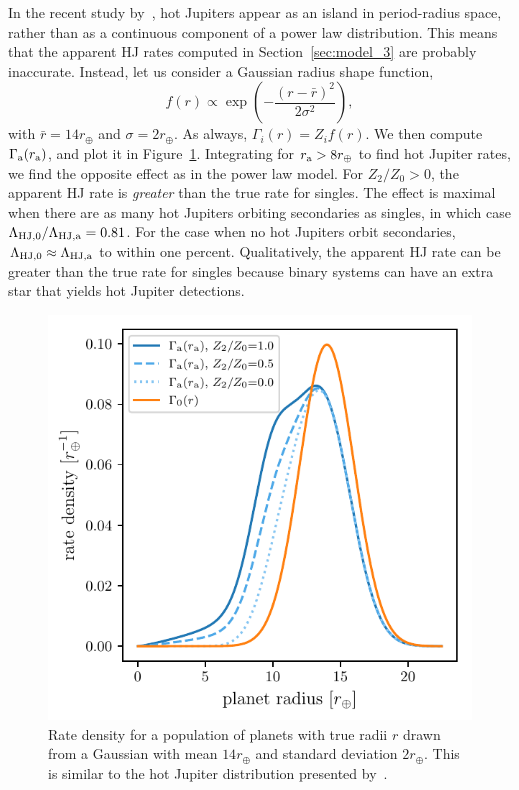 \documentclass[12pt,modern]{aastex61}
\renewcommand{\a}{_{\rm a}}
\begin{document}
In the recent study by~\citet{petigura_CKS_2017}, hot Jupiters appear as an 
island in period-radius space, rather than as a continuous component of a 
power law distribution.
This means that the apparent HJ rates computed in 
Section~\ref{sec:model_3} are probably inaccurate.
Instead, let us consider a Gaussian radius shape function,
\begin{equation}
f(r) \propto \exp \left( -\frac{(r-\bar{r})^2}{2\sigma^2} \right),
\end{equation}
with $\bar{r} = 14r_\oplus$ and $\sigma = 2r_\oplus$.
As always, $\Gamma_i(r) = Z_i f(r)$.
We then compute $\Gamma\a(r\a)$, and plot it in Figure~\ref{fig:gaussian_HJ}.
Integrating for $r\a > 8r_\oplus$ to find hot Jupiter rates,
we find the opposite effect as in the power law model.
For $Z_2/Z_0>0$, 
the apparent HJ rate is {\it greater} than the true rate for singles.
The effect is maximal when there are as many hot Jupiters orbiting secondaries 
as singles, in which case
$\Lambda_{{\rm HJ},0}/\Lambda_{\rm HJ,a} = 0.81$.
For the case when no hot Jupiters orbit secondaries, $\Lambda_{{\rm HJ},0} 
\approx \Lambda_{\rm HJ,a}$ to within one percent.
Qualitatively, the apparent HJ rate can be greater than the true rate for 
singles because binary systems can have an extra star that yields 
hot Jupiter detections.


\begin{figure}[!tb]
    \centering
    \includegraphics[width=.6\textwidth]{figures/int_rate_density_vs_radius_model_7_rpu_22.5_manyZs.pdf}
    \caption{
        Rate density for a population of planets with true radii $r$ drawn from
        a Gaussian with mean $14r_\oplus$ and standard deviation $2r_\oplus$.
        This is similar to the hot Jupiter distribution presented 
        by~\citet{petigura_CKS_2017}.
    }
    \label{fig:gaussian_HJ}
\end{figure}
\end{document}
